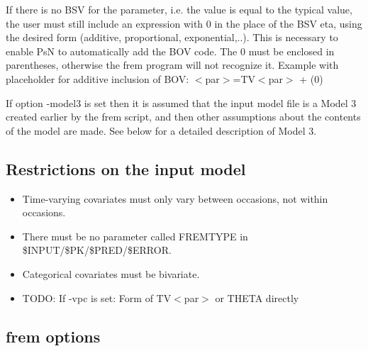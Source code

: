 \documentclass[a4paper,12pt]{article}
\begin{document}
If there is no BSV for the parameter, i.e. the value is equal to the typical value, the user must still include an expression with 0 in the place of the BSV eta, using the desired form (additive, proportional, exponential,..). This is necessary to enable PsN to automatically add the BOV code. The 0 must be enclosed in parentheses, otherwise the frem program will not recognize it. Example with placeholder for additive inclusion of BOV:
$<$par$>$=TV$<$par$>$ + (0)

If option -model3 is set then it is assumed that the input model file is a Model 3 created earlier by the frem script, and then other assumptions about the contents of the model are made. See below for a detailed description of Model 3.

\subsection{Restrictions on the input model}
\begin{itemize}
	\item Time-varying covariates must only vary between occasions, not within occasions. 
	\item There must be no parameter called FREMTYPE in \$INPUT/\$PK/\$PRED/\$ERROR.
	\item	Categorical covariates must be bivariate.
	\item TODO: If -vpc is set: Form of TV$<$par$>$ or THETA directly
\end{itemize}

\subsection{frem options}
\end{document}
